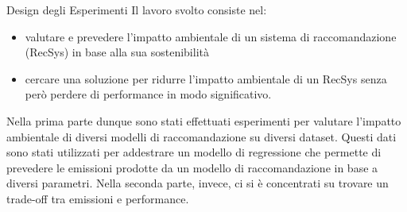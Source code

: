 \begin{frame}{Design degli Esperimenti}
    Il lavoro svolto consiste nel:
    \begin{itemize}
    \item valutare e prevedere l’impatto ambientale di un sistema di raccomandazione (RecSys) in base alla sua
    sostenibilità
    \item cercare una soluzione per ridurre l’impatto ambientale di un RecSys senza però perdere di performance in
    modo significativo.
    \end{itemize}
    Nella prima parte dunque sono stati effettuati esperimenti per valutare l’impatto ambientale di diversi modelli
    di raccomandazione su diversi dataset. Questi dati sono stati utilizzati per addestrare un modello di regressione
    che permette di prevedere le emissioni prodotte da un modello di raccomandazione in base a diversi parametri.
    Nella seconda parte, invece, ci si è concentrati su trovare un trade-off tra emissioni e performance.
\end{frame}